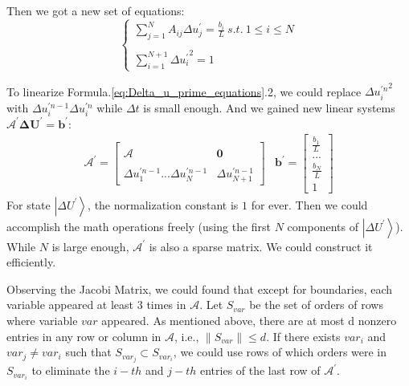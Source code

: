\documentclass[%
 reprint,
 amsmath,amssymb,
pra,
]{revtex4-1}
\begin{document}
Then we got a new set of equations:
\begin{equation}\label{eq:Delta_u_prime_equations}
	\left\{
	\begin{array}{l}
		\sum_{j=1}^{N}A_{ij}\Delta u_j^{\prime} = \frac{b_i}{L} \ s.t. \ 1\leq i \leq N\\
		\\
		\sum_{i=1}^{N + 1}{\Delta u_i^{\prime}}^2 = 1
	\end{array}
	\right.
\end{equation}

To linearize Formula.\ref{eq:Delta_u_prime_equations}.2, we could replace ${\Delta u^{\prime n}_i}^2$ with $\Delta u^{\prime n - 1}_i \Delta u^{\prime n}_i$ while $\Delta t$ is small enough. And we gained new linear systems $\mathcal{A^{\prime}} \bm{\Delta U^{\prime}} = \bm{b^{\prime}}$: 
\begin{equation}
\begin{array}{cc}
	\mathcal{A^{\prime}} = \left[
	\begin{array}{cc}
		&\\
		\mathcal{A} & \bm{0}\\
		&\\
		\Delta u^{\prime n - 1}_1...\Delta u^{\prime n - 1}_N&\Delta u^{\prime n - 1}_{N+1}
	\end{array}
	\right]
	&
	\bm{b^{\prime}} = \left[
	\begin{array}{c}
		\frac{b_1}{L}\\
		...\\
		\frac{b_N}{L}\\
		1
	\end{array}
	\right]
	
\end{array}
\end{equation}
For state $\left|\Delta U^{\prime}\right\rangle$, the normalization constant is $1$ for ever. Then we could accomplish the math operations freely (using the first $N$ components of $\left|\Delta U^{\prime}\right\rangle$). While $N$ is large enough, $\mathcal{A^{\prime}}$ is also a sparse matrix. We could construct it efficiently.

\iffalse
Observing the Jacobi Matrix, we could found that except for boundaries, each variable appeared at least $3$ times in $\mathcal{A}$. Let $S_{var}$ be the set of orders of rows where variable $var$ appeared. As mentioned above, there are at most d nonzero entries in any row or column in $\mathcal{A}$, i.e., $\left\|S_{var}\right\|\leq d$. If there exists $var_i$ and $var_j\neq var_i$ such that $S_{var_j}\subset S_{var_i}$, we could use rows of which orders were in $S_{var_i}$ to eliminate the $i-th$ and $j-th$ entries of the last row of $\mathcal{A^{\prime}}$. 
\end{document}
